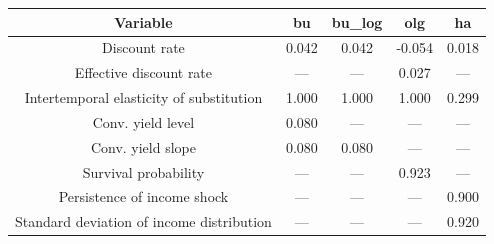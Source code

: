 \begin{table}[!ht]
\setlength\tabcolsep{0.425em}
\setlength\aboverulesep{0pt}
\setlength\belowrulesep{0.2em}
\centering
\begin{threeparttable}
\begin{tabular}{ccccc}
\toprule[0.1em]
Variable & bu & bu\_log & olg & ha \\[0.2em]
\midrule[0.075em]
Discount rate & 0.042 & 0.042 & -0.054 & 0.018 \\[0.2em]
Effective discount rate & --- & --- & 0.027 & --- \\[0.2em]
Intertemporal elasticity of substitution & 1.000 & 1.000 & 1.000 & 0.299 \\[0.2em]
Conv. yield level & 0.080 & --- & --- & --- \\[0.2em]
Conv. yield slope & 0.080 & 0.080 & --- & --- \\[0.2em]
Survival probability & --- & --- & 0.923 & --- \\[0.2em]
Persistence of income shock & --- & --- & --- & 0.900 \\[0.2em]
Standard deviation of income distribution & --- & --- & --- & 0.920 \\[0.2em]
\bottomrule[0.1em]
\end{tabular}
\end{threeparttable}
\end{table}
